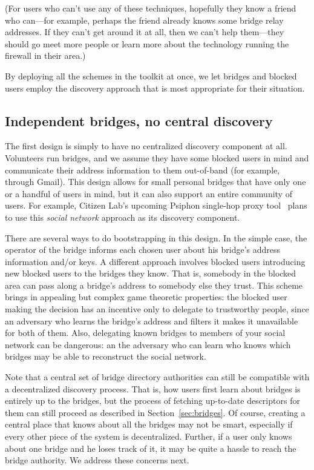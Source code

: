 \documentclass{llncs}
\begin{document}
(For users who can't use any of these techniques, hopefully they know
a friend who can---for example, perhaps the friend already knows some
bridge relay addresses. If they can't get around it at all, then we
can't help them---they should go meet more people or learn more about
the technology running the firewall in their area.)

By deploying all the schemes in the toolkit at once, we let bridges and
blocked users employ the discovery approach that is most appropriate
for their situation.

\subsection{Independent bridges, no central discovery}

The first design is simply to have no centralized discovery component at
all. Volunteers run bridges, and we assume they have some blocked users
in mind and communicate their address information to them out-of-band
(for example, through Gmail). This design allows for small personal
bridges that have only one or a handful of users in mind, but it can
also support an entire community of users. For example, Citizen Lab's
upcoming Psiphon single-hop proxy tool~\cite{psiphon} plans to use this
\emph{social network} approach as its discovery component.

There are several ways to do bootstrapping in this design. In the simple
case, the operator of the bridge informs each chosen user about his
bridge's address information and/or keys. A different approach involves
blocked users introducing new blocked users to the bridges they know.
That is, somebody in the blocked area can pass along a bridge's address to
somebody else they trust. This scheme brings in appealing but complex game
theoretic properties: the blocked user making the decision has an incentive
only to delegate to trustworthy people, since an adversary who learns
the bridge's address and filters it makes it unavailable for both of them.
Also, delegating known bridges to members of your social network can be
dangerous: an the adversary who can learn who knows which bridges may
be able to reconstruct the social network.

Note that a central set of bridge directory authorities can still be
compatible with a decentralized discovery process. That is, how users
first learn about bridges is entirely up to the bridges, but the process
of fetching up-to-date descriptors for them can still proceed as described
in Section~\ref{sec:bridges}. Of course, creating a central place that
knows about all the bridges may not be smart, especially if every other
piece of the system is decentralized. Further, if a user only knows
about one bridge and he loses track of it, it may be quite a hassle to
reach the bridge authority. We address these concerns next.
\end{document}
